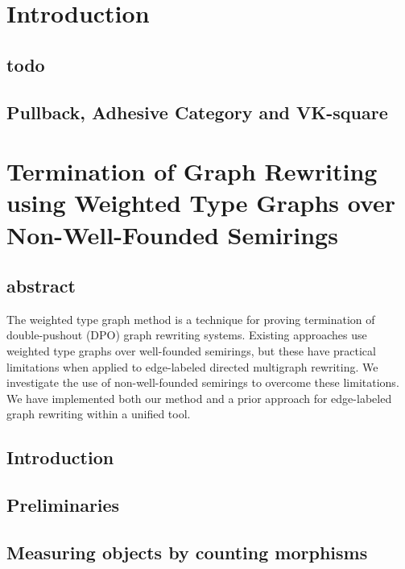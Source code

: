 \documentclass{book}
\begin{document}
  
  
%   
 
\tableofcontents  
\newpage     
 
\chapter{Introduction}
\section{todo}
\section{Pullback, Adhesive Category and VK-square}


\chapter{Termination of Graph Rewriting
using Weighted Type Graphs
over Non-Well-Founded Semirings}

\section{abstract}
The weighted type graph method is a technique for proving termination of double-pushout (DPO) graph rewriting systems. 
Existing approaches use weighted type graphs over well-founded semirings, but these have practical limitations when applied to edge-labeled directed multigraph rewriting.
We investigate the use of non-well-founded semirings to overcome these limitations.
We have implemented both our method and a prior approach for edge-labeled graph rewriting within a unified tool.
\section{Introduction}

\label{sec:type_graph:introduction}

 
\section{Preliminaries}
\label{sec:type_graph:preliminaries}
 
\section{Measuring objects by counting morphisms}
\label{sec:type_graph:measuring_graphs}

% 
\end{document}
